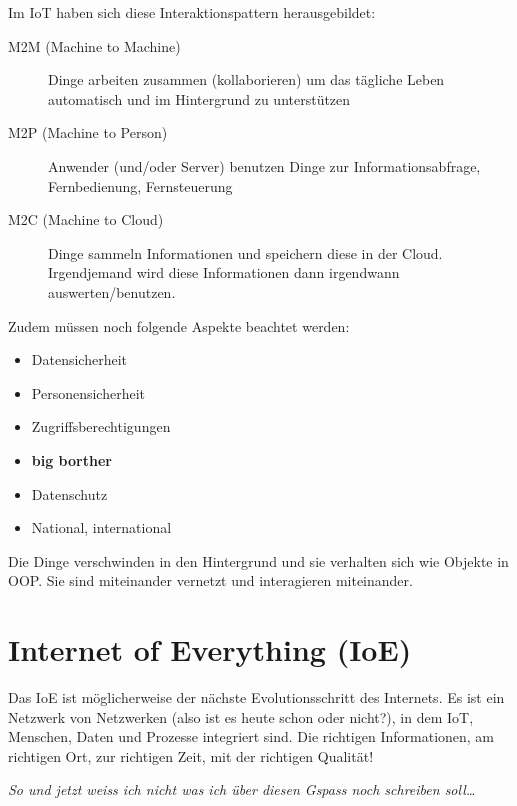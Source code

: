 Im IoT haben sich diese Interaktionspattern herausgebildet:
\begin{description}
	\item[M2M (Machine to Machine)] Dinge arbeiten zusammen (kollaborieren) um das tägliche Leben automatisch und im Hintergrund zu unterstützen
	\item[M2P (Machine to Person)] Anwender (und/oder Server) benutzen Dinge zur Informationsabfrage, Fernbedienung, Fernsteuerung
	\item[M2C (Machine to Cloud)] Dinge sammeln Informationen und speichern diese in der Cloud. Irgendjemand wird diese Informationen dann irgendwann auswerten/benutzen.
\end{description}
Zudem müssen noch folgende Aspekte beachtet werden:
\begin{itemize}
	\item Datensicherheit
	\item Personensicherheit
	\item Zugriffsberechtigungen
	\item \textbf{big borther}
	\item Datenschutz
	\item National, international
\end{itemize}

Die Dinge verschwinden in den Hintergrund und sie verhalten sich wie Objekte in OOP. Sie sind miteinander vernetzt und interagieren miteinander.

\section{Internet of Everything (IoE)}

Das IoE ist möglicherweise der nächste Evolutionsschritt des Internets. Es ist ein Netzwerk von Netzwerken (also ist es heute schon oder nicht?), in dem IoT, Menschen, Daten und Prozesse integriert sind. Die richtigen Informationen, am richtigen Ort, zur richtigen Zeit, mit der richtigen Qualität!

\textit{So und jetzt weiss ich nicht was ich über diesen Gspass noch schreiben soll\dots}